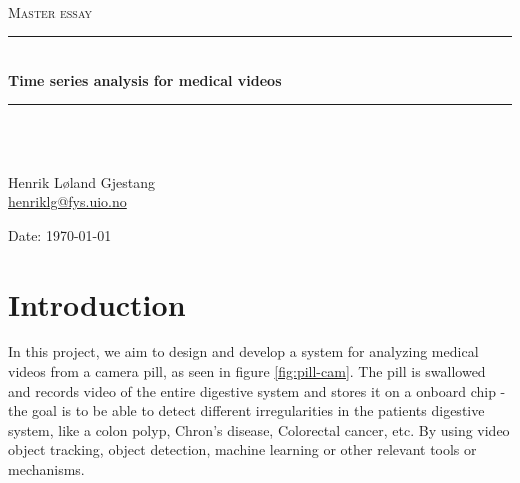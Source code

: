 \documentclass[english, a4paper]{report}
\begin{document}
\begin{titlepage}
  \begin{center}

  \textsc{}\\[1.0cm]
  \textsc{\Large Master essay}\\[0.5cm]
  \rule{\linewidth}{0.5mm} \\[0.4cm]
  {\huge \bfseries Time series analysis for medical videos}\\[0.10cm]
  \rule{\linewidth}{0.5mm} \\[1.5cm]
  \textsc{}\\[7.0cm]

  \begin{minipage}{0.69\textwidth}
    \begin{center} \large
      Henrik Løland Gjestang\\ \url{henriklg@fys.uio.no} \\[0.8cm]
    \end{center}
  \end{minipage}
  \vfill

  \large{Date: \today}
  \end{center}
\end{titlepage}


\tableofcontents
\newpage




\section{Introduction}

In this project, we aim to design and develop a system for analyzing medical videos from a camera pill, as seen in figure \ref{fig:pill-cam}. The pill is swallowed and records video of the entire digestive system and stores it on a onboard chip - the goal is to be able to detect different irregularities in the patients digestive system, like a colon polyp, Chron's disease, Colorectal cancer, etc. By using video object tracking, object detection, machine learning or other relevant tools or mechanisms.
\end{document}
